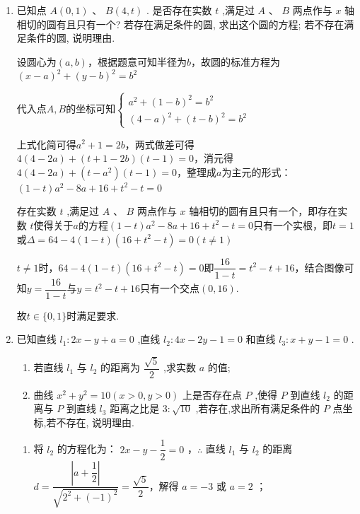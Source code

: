 \begin{enumerate}
    \item 已知点 $A\left( {0,1}\right)$ 、 $B\left( {4,t}\right)$ . 是否存在实数 $t$ ,满足过 $A$ 、 $B$ 两点作与 $x$ 轴相切的圆有且只有一个? 若存在满足条件的圆, 求出这个圆的方程; 若不存在满足条件的圆, 说明理由.
    \begin{jieda}
        设圆心为$(a, b)$，根据题意可知半径为$b$，故圆的标准方程为$(x-a)^2+(y-b)^2 = b^2$
        
        代入点$A, B$的坐标可知$\left\{\begin{array}{l}
             a^2+(1-b)^2 = b^2 \\
             (4-a)^2+(t-b)^2 = b^2
        \end{array}\right.$

        上式化简可得$a^2+1=2b$，两式做差可得$4(4-2a)+(t+1-2b)(t-1) = 0$，消元得$4(4-2a)+(t-a^2)(t-1) = 0$，整理成$a$为主元的形式：$(1-t)a^2 - 8a + 16+t^2-t = 0$

        存在实数 $t$ ,满足过 $A$ 、 $B$ 两点作与 $x$ 轴相切的圆有且只有一个，即存在实数 $t$使得关于$a$的方程$(1-t)a^2 - 8a + 16+t^2-t = 0$只有一个实根，即$t = 1$或$\Delta = 64 - 4(1-t)(16+t^2-t) = 0 (t \neq 1)$

        $t \neq 1$时，$64 - 4(1-t)(16+t^2-t) = 0$即$\dfrac{16}{1-t} = t^2-t+16$，结合图像可知$y = \dfrac{16}{1-t}$与$y = t^2-t+16$只有一个交点$(0, 16)$.

        故$t \in \{0, 1\}$时满足要求.

    \end{jieda}
    

    \item 已知直线 ${l}_{1} : {2x} - y + a = 0$ ,直线 ${l}_{2} : {4x} - {2y} - 1 = 0$ 和直线 ${l}_{3} : x + y - 1 = 0$ .
    \begin{enumerate}
        \item 若直线 ${l}_{1}$ 与 ${l}_{2}$ 的距离为 $\dfrac{\sqrt{5}}{2}$ ,求实数 $a$ 的值;
        \item 曲线 ${x}^{2} + {y}^{2} = {10}\left( {x > 0,y > 0}\right)$ 上是否存在点 $P$ ,使得 $P$ 到直线 ${l}_{2}$ 的距离与 $P$ 到直线 ${l}_{3}$ 距离之比是 $3 : \sqrt{10}$ ,若存在,求出所有满足条件的 $P$ 点坐标,若不存在, 说明理由.
    \end{enumerate}
    \begin{jieda}
        \begin{enumerate}
            \item 将 $l_2$ 的方程化为： $2 x-y-\dfrac{1}{2}=0$ ，$\therefore$ 直线 $l_1$ 与 $l_2$ 的距离 $d=\dfrac{\left|a+\dfrac{1}{2}\right|}{\sqrt{2^2+(-1)^2}}=\dfrac{\sqrt{5}}{2}$，解得 $a=-3$ 或 $a=2$ ；


\end{enumerate}
\end{jieda}
\end{enumerate}
